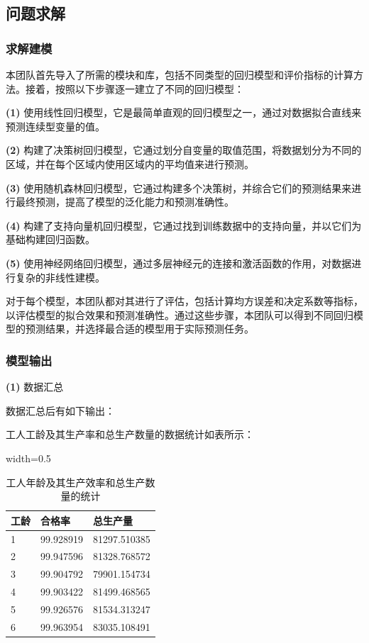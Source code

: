 \documentclass[withoutpreface,bwprint]{cumcmthesis}
\begin{document}
\subsection{问题求解}

\subsubsection{求解建模}

本团队首先导入了所需的模块和库，包括不同类型的回归模型和评价指标的计算方法。接着，按照以下步骤逐一建立了不同的回归模型：

\textbf{(1)} 使用线性回归模型，它是最简单直观的回归模型之一，通过对数据拟合直线来预测连续型变量的值。

\textbf{(2)} 构建了决策树回归模型，它通过划分自变量的取值范围，将数据划分为不同的区域，并在每个区域内使用区域内的平均值来进行预测。

\textbf{(3)} 使用随机森林回归模型，它通过构建多个决策树，并综合它们的预测结果来进行最终预测，提高了模型的泛化能力和预测准确性。

\textbf{(4)} 构建了支持向量机回归模型，它通过找到训练数据中的支持向量，并以它们为基础构建回归函数。

\textbf{(5)} 使用神经网络回归模型，通过多层神经元的连接和激活函数的作用，对数据进行复杂的非线性建模。


对于每个模型，本团队都对其进行了评估，包括计算均方误差和决定系数等指标，以评估模型的拟合效果和预测准确性。通过这些步骤，本团队可以得到不同回归模型的预测结果，并选择最合适的模型用于实际预测任务。

\subsubsection{模型输出}

\textbf{(1)} 数据汇总
\vspace{1em}

数据汇总后有如下输出：

工人工龄及其生产率和总生产数量的数据统计如表所示：

\begin{table}[htbp]
  \centering
  \begin{adjustbox}{width=0.5\textwidth}
    \begin{tabular}{lll}
    \toprule
    工龄 & 合格率 & 总生产量 \\
    \midrule
    1  & 99.928919 & 81297.510385 \\
    2  & 99.947596 & 81328.768572 \\
    3  & 99.904792 & 79901.154734 \\
    4  & 99.903422 & 81499.468565 \\
    5  & 99.926576 & 81534.313247 \\
    6  & 99.963954 & 83035.108491 \\
    \bottomrule
    \end{tabular}%
  \end{adjustbox}
  \caption{工人年龄及其生产效率和总生产数量的统计}
  \label{tab:addlabel}%
\end{table}%
\end{document}

